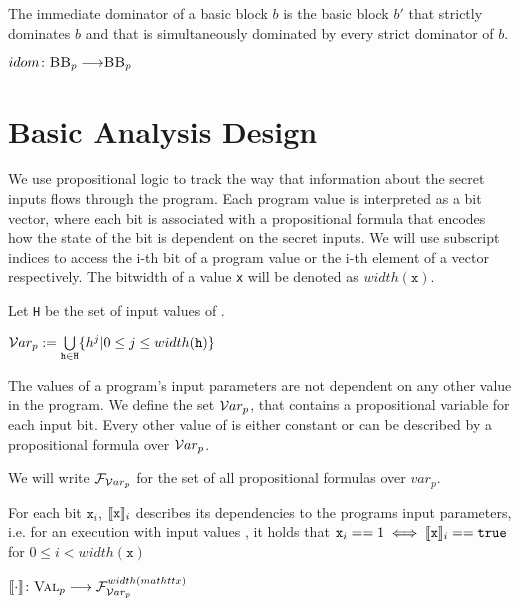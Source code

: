 \begin{definition} The immediate dominator of a basic block $b$ is the basic block $b'$ that strictly dominates $b$ and that is simultaneously dominated by every strict dominator of $b$.
    \begin{center}
        $idom\colon \mbb_p \longrightarrow \mbb_p$
    \end{center}
\end{definition}

\section{Basic Analysis Design}

We use propositional logic to track the way that information about the secret inputs flows through the program. Each program value is interpreted as a bit vector, where each bit is associated with a propositional formula that encodes how the state of the bit is dependent on the secret inputs. We will use subscript indices to access the i-th bit of a program value or the i-th element of a vector respectively. The bitwidth of a value \texttt{x} will be denoted as $width(\mathtt{x})$.


\begin{definition}
    Let \texttt{H} be the set of input values of \pp.
    \begin{center}
        $\mathcal{V}ar_p := \bigcup\limits_{\mathtt{h} \in \mathtt{H}} \{h^j | 0 \leq j \leq width(\mathtt{h})\}$
    \end{center}
    The values of a program's input parameters are not dependent on any other value in the program. We define the set $\mathcal{V}ar_p$, that contains a propositional variable for each input bit. Every other value of \p is either constant or can be described by a propositional formula over $\mathcal{V}ar_p$.
\end{definition}

We will write $\mathcal{F}_{\mathcal{V}ar_p}$ for the set of all propositional formulas over $var_p$.

\begin{definition}
    For each bit $\mathtt{x}_i$, $\llbracket\mathtt{x}\rrbracket_i$ describes its dependencies to the programs input parameters, i.e. for an execution with input values \In, it holds that $\mathtt{x}_i == 1 \iff \llbracket\mathtt{x}\rrbracket_i == \mathtt{true}$ for $0 \leq i < width(\mathtt{x})$
    \begin{center}
        $\llbracket \cdot \rrbracket\colon \textsc{Val}_p \longrightarrow \mathcal{F}_{\mathcal{V}ar_p}^{width(mathtt{x})}$
    \end{center}
\end{definition}

